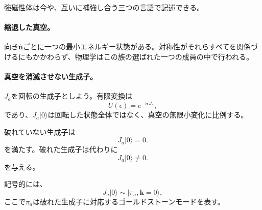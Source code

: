 強磁性体は今や、互いに補強し合う三つの言語で記述できる。

\paragraph{縮退した真空。}
向き\(\hat{\mathbf n}\)ごとに一つの最小エネルギー状態がある。対称性がそれらすべてを関係づけるにもかかわらず、物理学はこの族の選ばれた一つの成員の中で行われる。

\paragraph{真空を消滅させない生成子。}
\(J_a\)を回転の生成子としよう。有限変換は
\begin{equation}
U(\epsilon)=e^{-i\epsilon J_a},
\end{equation}
であり、\(J_a|0\rangle\)は回転した状態全体ではなく、真空の無限小変化に比例する。

\begin{classroomqa}
\end{classroomqa}

破れていない生成子は
\begin{equation}
J_a|0\rangle=0.
\label{eq:l9-unbroken-generator}
\end{equation}
を満たす。破れた生成子は代わりに
\begin{equation}
J_a|0\rangle\neq0.
\label{eq:l9-broken-generator}
\end{equation}
を与える。

\begin{classroomqa}
\end{classroomqa}

\begin{classroomqa}
\end{classroomqa}

記号的には、
\begin{equation}
J_a|0\rangle
\sim
|\pi_a,\mathbf k=0\rangle,
\label{eq:l9-generator-goldstone}
\end{equation}
ここで\(\pi_a\)は破れた生成子に対応するゴールドストーンモードを表す。


